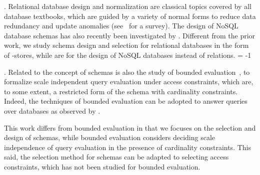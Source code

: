 .
Relational database design and normalization are classical topics
covered by all database textbooks, which are guided by a %
variety of
normal forms to reduce data redundancy and update anomalies
(see~\cite{DBSchema} for a survey). The design of NoSQL database
schemas has also recently been investigated by \eg
\cite{NoSQLschema1,NoSQLschema2}. Different from the
  prior work, we study
schema design and selection for relational databases in the
form of \kv-stores, while \cite{NoSQLschema1,NoSQLschema2} are
for the design of NoSQL databases instead of relations.
\looseness = -1




.
Related to the concept of \baav schemas is also the study of
bounded evaluation~\cite{PODS14,PODS15,SIGMOD16,PODS16}, to
formalize scale independent query evaluation under access
constraints, which are, to some extent, a restricted form of the
\baav schema with cardinality constraints. %
Indeed, the techniques of bounded evaluation can be adopted to answer
queries over \baav databases as observed by \cite{VLDB19}.


This work differs from bounded evaluation in that we focuses on
the selection and design of \baav schemas, while bounded
evaluation considers deciding scale independence of query
evaluation %
in the presence of cardinality constraints.
This said, the selection method for \baav schemas can be
  adapted to selecting access constraints, which has not been
  studied for bounded evaluation.


